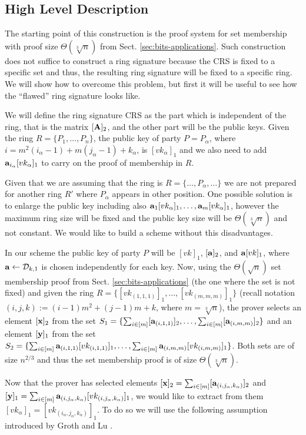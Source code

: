\subsection{High Level Description}
The starting point of this construction is the proof system for set membership with proof size $\Theta(\sqrt[3]{n})$ from Sect. \ref{sec:bits-applications}. Such construction does not suffice to construct a ring signature because the CRS is fixed to a specific set and thus, the resulting ring signature will be fixed to a specific ring. We will show how to overcome this problem, but first it will be useful to see how the ``flawed'' ring signature looks like.

We will define the ring signature CRS as the part which is independent of the ring, that is the matrix $[\mathbf{{A}}]_2$, and the other part will be the public keys. Given the ring $R=\{P_1,\ldots,P_n\}$, the public key of party $P=P_\alpha$, where $i=m^2(i_\alpha-1)+m(j_\alpha-1)+k_\alpha$, is $[vk_\alpha]_1$ and we also need to add $\mathbf{a}_{i_\alpha}[vk_\alpha]_1$ to carry on the proof of membership in $R$. 

Given that we are assuming that the ring is $R=\{\ldots,P_\alpha,\ldots\}$ we are not prepared for another ring $R'$ where $P_\alpha$ appears in other position. One possible solution is to enlarge the public key including also $\mathbf{a}_{1}[vk_\alpha]_1,\ldots,\mathbf{a}_{m}[vk_\alpha]_1$, however the maximum ring size will be fixed and the public key size will be $\Theta(\sqrt[3]{n})$ and not constant. We would like to build a scheme without this disadvantages.

In our scheme the public key of party $P$ will be $[vk]_1$, $[\mathbf{a}]_2$, and $\mathbf{a}[vk]_1$, where $\mathbf{a}\gets\mathcal{D}_{k,1}$ is chosen independently for each key. Now, using the $\Theta(\sqrt{n})$ set membership proof from Sect. \ref{sec:bits-applications} (the one where the set is not fixed) and given the ring $R=\{[vk_{(1,1,1)}]_1,\ldots,[vk_{(m,m,m)}]_1\}$ (recall notation $(i,j,k):=(i-1)m^2+(j-1)m+k$, where $m=\sqrt[3]{n}$), the prover selects an element $[\mathbf{x}]_2$ from the set $S_1=\{\sum_{i\in[m]}[\mathbf{a}_{(i,1,1)}]_2,\ldots,\sum_{i\in[m]}[\mathbf{a}_{(i,m,m)}]_2\}$ and an element $[\mathbf{y}]_1$ from the set $S_2=\{\sum_{i\in[m]}\mathbf{a}_{(i,1,1)}[vk_{(i,1,1)}]_1,\ldots,\sum_{i\in[m]}\mathbf{a}_{(i,m,m)}[vk_{(i,m,m)}]_1\}$. Both sets are of size $n^{2/3}$ and thus the set membership proof is of size $\Theta(\sqrt[3]{n})$.

Now that the prover has selected elements $[\mathbf{x}]_2=\sum_{i\in[m]}[\mathbf{a}_{(i,j_\alpha,k_\alpha)}]_2$ and $[\mathbf{y}]_1=\sum_{i\in[m]}\mathbf{a}_{(i,j_\alpha,k_\alpha)}[vk_{(i,j_\alpha,k_\alpha)}]_1$, we would like to extract from them  $[vk_\alpha]_1=[vk_{(i_\alpha,j_\alpha,k_\alpha)}]_1$. To do so we will use the following assumption introduced by Groth and Lu \cite{AC:GroLu07}.

